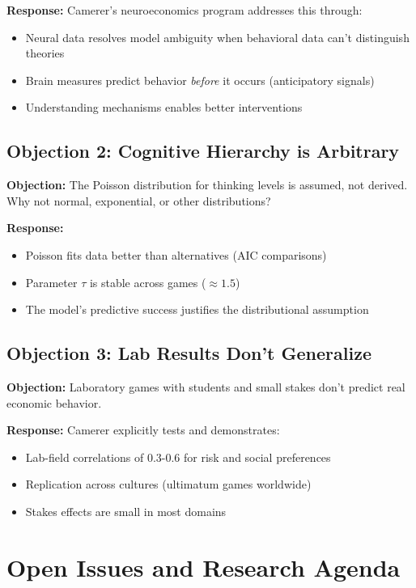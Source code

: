 \textbf{Response:} Camerer's neuroeconomics program addresses this through:
\begin{itemize}[nosep]
\item Neural data resolves model ambiguity when behavioral data can't distinguish theories
\item Brain measures predict behavior \textit{before} it occurs (anticipatory signals)
\item Understanding mechanisms enables better interventions
\end{itemize}

\subsection{Objection 2: Cognitive Hierarchy is Arbitrary}

\textbf{Objection:} The Poisson distribution for thinking levels is assumed, not derived. Why not normal, exponential, or other distributions?

\textbf{Response:}
\begin{itemize}[nosep]
\item Poisson fits data better than alternatives (AIC comparisons)
\item Parameter $\tau$ is stable across games ($\approx 1.5$)
\item The model's predictive success justifies the distributional assumption
\end{itemize}

\subsection{Objection 3: Lab Results Don't Generalize}

\textbf{Objection:} Laboratory games with students and small stakes don't predict real economic behavior.

\textbf{Response:} Camerer explicitly tests and demonstrates:
\begin{itemize}[nosep]
\item Lab-field correlations of 0.3-0.6 for risk and social preferences
\item Replication across cultures (ultimatum games worldwide)
\item Stakes effects are small in most domains
\end{itemize}


\section{Open Issues and Research Agenda}
\label{sec:ca-open}

